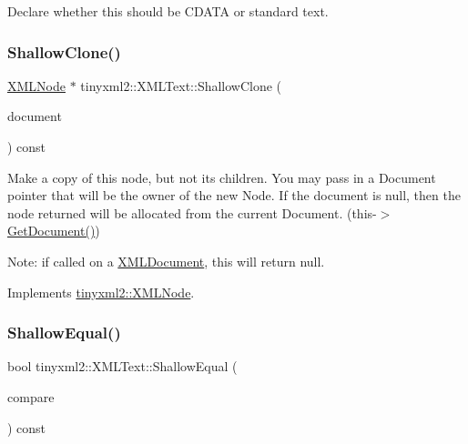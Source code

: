 Declare whether this should be C\+D\+A\+TA or standard text. 

\mbox{\label{classtinyxml2_1_1_x_m_l_text_a86d265c93152726c8c6831e9594840e6}} 
\subsubsection{\texorpdfstring{Shallow\+Clone()}{ShallowClone()}}
{\footnotesize\ttfamily \hyperlink{classtinyxml2_1_1_x_m_l_node}{X\+M\+L\+Node} $\ast$ tinyxml2\+::\+X\+M\+L\+Text\+::\+Shallow\+Clone (\begin{DoxyParamCaption}\item[{\hyperlink{classtinyxml2_1_1_x_m_l_document}{X\+M\+L\+Document} $\ast$}]{document }\end{DoxyParamCaption}) const\hspace{0.3cm}{\ttfamily [virtual]}}

Make a copy of this node, but not its children. You may pass in a Document pointer that will be the owner of the new Node. If the \textquotesingle{}document\textquotesingle{} is null, then the node returned will be allocated from the current Document. (this-\/$>$\hyperlink{classtinyxml2_1_1_x_m_l_node_af343d1ef0b45c0020e62d784d7e67a68}{Get\+Document()})

Note\+: if called on a \hyperlink{classtinyxml2_1_1_x_m_l_document}{X\+M\+L\+Document}, this will return null. 

Implements \hyperlink{classtinyxml2_1_1_x_m_l_node_a8402cbd3129d20e9e6024bbcc0531283}{tinyxml2\+::\+X\+M\+L\+Node}.

\mbox{\label{classtinyxml2_1_1_x_m_l_text_a99d8bce4dc01df889126e047f358cdfc}} 
\subsubsection{\texorpdfstring{Shallow\+Equal()}{ShallowEqual()}}
{\footnotesize\ttfamily bool tinyxml2\+::\+X\+M\+L\+Text\+::\+Shallow\+Equal (\begin{DoxyParamCaption}\item[{const \hyperlink{classtinyxml2_1_1_x_m_l_node}{X\+M\+L\+Node} $\ast$}]{compare }\end{DoxyParamCaption}) const\hspace{0.3cm}{\ttfamily [virtual]}}


